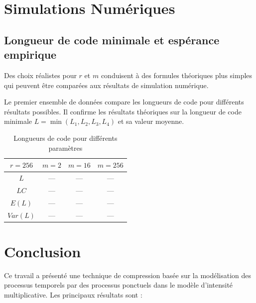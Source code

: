 \documentclass[11pt,a4paper]{article}
\begin{document}
	\section{Simulations Numériques}
	\label{sec:simulations}
	
	\subsection{Longueur de code minimale et espérance empirique}
	\label{subsec:longueur_code_minimale}
	
	Des choix réalistes pour $r$ et $m$ conduisent à des formules théoriques plus simples qui peuvent être comparées aux résultats de simulation numérique.
	
	Le premier ensemble de données compare les longueurs de code pour différents résultats possibles. Il confirme les résultats théoriques sur la longueur de code minimale $L=\min(L_1,L_2,L_3,L_4)$ et sa valeur moyenne.
	
	\begin{table}[h]
		\centering
		\caption{Longueurs de code pour différents paramètres}
		\label{tab:simulations}
		\begin{tabular}{||c|c|c|c||}
			\hline
			$r=256$ & $m = 2$ & $m = 16$ & $m = 256$ \\
			\hline
			$L$ & --- & --- & --- \\
			\hline
			$LC$ & --- & --- & --- \\
			\hline
			$E(L)$ & --- & --- & --- \\
			\hline
			$Var(L)$ & --- & --- & --- \\
			\hline
		\end{tabular}
	\end{table}
	
	\section{Conclusion}
	\label{sec:conclusion}
	
	Ce travail a présenté une technique de compression basée sur la modélisation des processus temporels par des processus ponctuels dans le modèle d'intensité multiplicative. Les principaux résultats sont :
	
\end{document}
